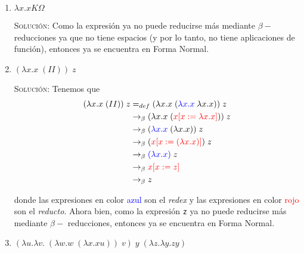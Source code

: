 \documentclass[letterpaper,11pt]{article}
\begin{document}
\begin{enumerate}
    \begin{enumerate}
        \item $\lambda x.xK\Omega$

        \textsc{Solución:} Como la expresión ya no puede reducirse más mediante 
        $\beta-$reducciones ya que no tiene espacios (y por lo tanto, no tiene 
        aplicaciones de función), entonces ya se encuentra en Forma Normal.

        \item $(\lambda x.x \; (II)) \; z$

        \textsc{Solución:} Tenemos que 
        \begin{align*}
            (\lambda x.x \; (II)) \; z 
            &=_{def} (\lambda x.x \; (\textcolor{blue}{\lambda x.x} \;
                                      \lambda x.x)) \; z \\
            &\rightarrow_{\beta} (\lambda x.x \; 
                                 (\textcolor{red}{x [x := \lambda x.x]})) 
                                 \; z \\
            &\rightarrow_{\beta}
            (\textcolor{blue}{\lambda x.x} \; (\lambda x.x)) \; z \\ 
            &\rightarrow_{\beta} (\textcolor{red}{x [x := (\lambda x.x)]}) \; z \\ 
            &\rightarrow_{\beta} \textcolor{blue}{(\lambda x.x)} \; z \\
            &\rightarrow_{\beta} \textcolor{red}{x [x := z]} \\
            &\rightarrow_{\beta} z
        \end{align*}

        donde las expresiones en color \textcolor{blue}{azul} son el 
        \textit{redex} y las expresiones en color \textcolor{red}{rojo} son el 
        \textit{reducto}. Ahora bien, como la expresión \texttt{z} ya no puede
        reducirse más mediante $\beta-$ reducciones, entonces ya se encuentra 
        en Forma Normal.

        \item $(\lambda u. \lambda v. \; (\lambda w.w \; (\lambda x.xu)) \; v) 
        \; y \; (\lambda z. \lambda y.zy)$


\end{enumerate}
\end{enumerate}
\end{document}
